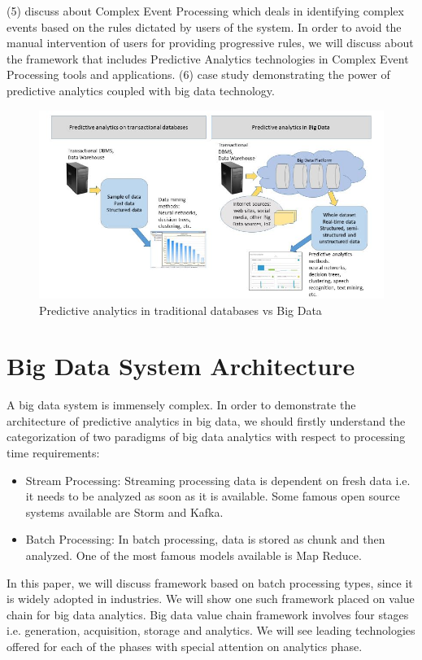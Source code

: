 \documentclass[runningheads]{llncs}
\begin{document}
(5) discuss about Complex Event Processing which deals in identifying complex events based on the rules dictated by users of the system. In order to avoid the manual intervention of users for providing progressive rules, we will discuss about the framework that includes Predictive Analytics technologies in Complex Event Processing tools and applications. \newline
(6) case study demonstrating the power of predictive analytics coupled with big data technology.
\begin{figure}[htbp]
	\centering
	\vspace{-0.85cm}
	\hspace*{-0.45cm}
	\includegraphics[scale=0.6]{Figure3.jpg}
	\caption{Predictive analytics in traditional databases vs Big Data}
	\label{fig:Figure3}
	\vspace{3.5cm}
\end{figure}
\section{Big Data System Architecture}
A big data system is immensely complex. In order to demonstrate the architecture of predictive analytics in big data, we should firstly understand the categorization of two paradigms of big data analytics with respect to processing time requirements:
\begin{itemize}
	\item Stream Processing: Streaming processing data is dependent on fresh data i.e. it needs to be analyzed as soon as it is available. Some famous open source systems available are Storm and Kafka.
	\item Batch Processing: In batch processing, data is stored as chunk and then analyzed. One of the most famous models available is Map Reduce.
\end{itemize}
In this paper, we will discuss framework based on batch processing types, since it is widely adopted in industries. We will show one such framework placed on value chain for big data analytics\cite{5}. Big data value chain framework involves four stages i.e. generation, acquisition, storage and analytics. We will see leading technologies offered for each of the phases with special attention on analytics phase.
\end{document}
